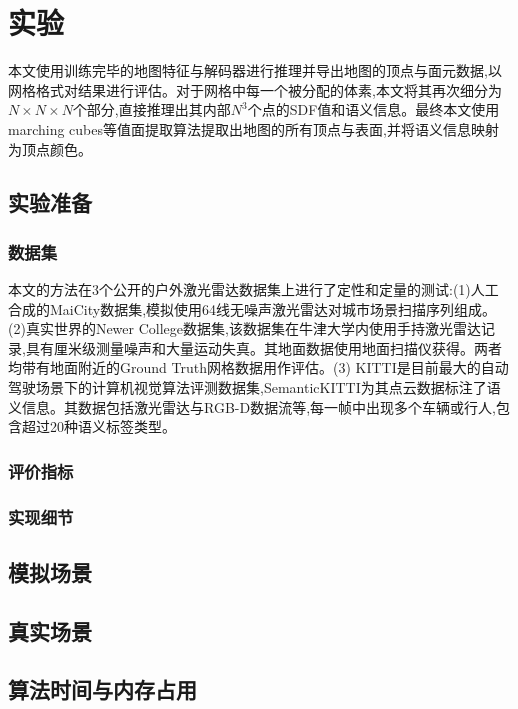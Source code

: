 \section{实验}\label{numerical experiments}
本文使用训练完毕的地图特征与解码器进行推理并导出地图的顶点与面元数据,以网格格式对结果进行评估。对于网格中每一个被分配的体素,本文将其再次细分为$N \times N \times N$个部分,直接推理出其内部$N^3$个点的SDF值和语义信息。最终本文使用marching cubes\cite{marchingcubes}等值面提取算法提取出地图的所有顶点与表面,并将语义信息映射为顶点颜色。
\subsection{实验准备}
\subsubsection{数据集}
本文的方法在3个公开的户外激光雷达数据集上进行了定性和定量的测试:(1)人工合成的MaiCity数据集\cite{maicity},模拟使用64线无噪声激光雷达对城市场景扫描序列组成。(2)真实世界的Newer College数据集\cite{ncd},该数据集在牛津大学内使用手持激光雷达记录,具有厘米级测量噪声和大量运动失真。其地面数据使用地面扫描仪获得。两者均带有地面附近的Ground Truth网格数据用作评估。(3) KITTI\cite{KITTI}是目前最大的自动驾驶场景下的计算机视觉算法评测数据集,SemanticKITTI\cite{SemanticKITTI}为其点云数据标注了语义信息。其数据包括激光雷达与RGB-D数据流等,每一帧中出现多个车辆或行人,包含超过20种语义标签类型。
\subsubsection{评价指标}
\subsubsection{实现细节}
\subsection{模拟场景}
\subsection{真实场景}
\subsection{算法时间与内存占用}

